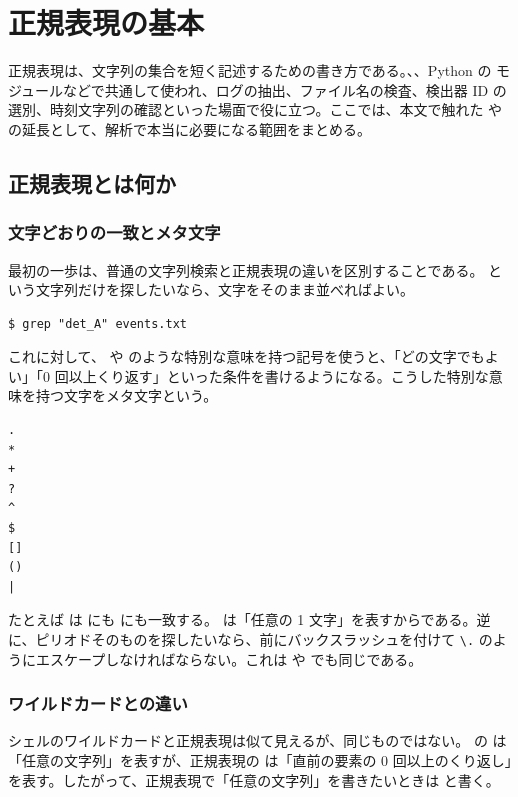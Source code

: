 \chapter{正規表現の基本}
\label{app:regex}

正規表現は、文字列の集合を短く記述するための書き方である。、、Python の  モジュールなどで共通して使われ、ログの抽出、ファイル名の検査、検出器 ID の選別、時刻文字列の確認といった場面で役に立つ。ここでは、本文で触れた  や  の延長として、解析で本当に必要になる範囲をまとめる。

\section{正規表現とは何か}

\subsection{文字どおりの一致とメタ文字}

最初の一歩は、普通の文字列検索と正規表現の違いを区別することである。 という文字列だけを探したいなら、文字をそのまま並べればよい。

\begin{lstlisting}[numbers=none, xleftmargin=2\zw]
$ grep "det_A" events.txt
\end{lstlisting}

これに対して、 や \code{*} のような特別な意味を持つ記号を使うと、「どの文字でもよい」「0 回以上くり返す」といった条件を書けるようになる。こうした特別な意味を持つ文字をメタ文字という。

\begin{lstlisting}[numbers=none, xleftmargin=2\zw]
.
*
+
?
^
$
[]
()
|
\end{lstlisting}

たとえば  は  にも  にも一致する。 は「任意の 1 文字」を表すからである。逆に、ピリオドそのものを探したいなら、前にバックスラッシュを付けて \texttt{\textbackslash.} のようにエスケープしなければならない。これは \code{+} や  でも同じである。

\subsection{ワイルドカードとの違い}

シェルのワイルドカードと正規表現は似て見えるが、同じものではない。 の \code{*} は「任意の文字列」を表すが、正規表現の \code{*} は「直前の要素の 0 回以上のくり返し」を表す。したがって、正規表現で「任意の文字列」を書きたいときは  と書く。

